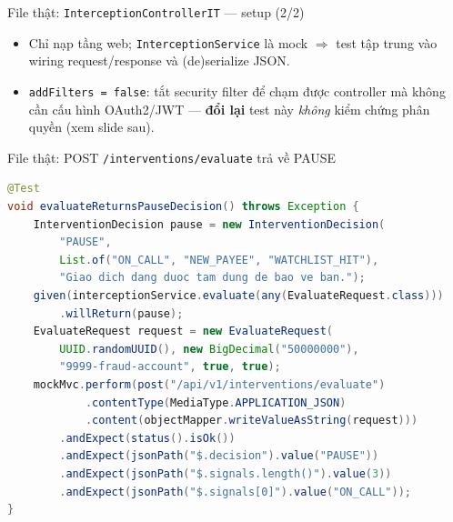 \documentclass[aspectratio=169,12pt]{beamer}
\begin{document}
\begin{frame}{File thật: \texttt{InterceptionControllerIT} --- setup (2/2)}
  \begin{itemize}\small
    \item Chỉ nạp tầng web; \texttt{InterceptionService} là mock $\Rightarrow$
      test tập trung vào wiring request/response và (de)serialize JSON.
    \item \texttt{addFilters = false}: tắt security filter để chạm được
      controller mà không cần cấu hình OAuth2/JWT --- \textbf{đổi lại} test này
      \emph{không} kiểm chứng phân quyền (xem slide sau).
  \end{itemize}
\end{frame}

\begin{frame}[fragile]{File thật: POST \texttt{/interventions/evaluate} trả về PAUSE}
\begin{lstlisting}[language=Java,style=codesm,basicstyle=\ttfamily\scriptsize]
@Test
void evaluateReturnsPauseDecision() throws Exception {
    InterventionDecision pause = new InterventionDecision(
        "PAUSE",
        List.of("ON_CALL", "NEW_PAYEE", "WATCHLIST_HIT"),
        "Giao dich dang duoc tam dung de bao ve ban.");
    given(interceptionService.evaluate(any(EvaluateRequest.class)))
        .willReturn(pause);
    EvaluateRequest request = new EvaluateRequest(
        UUID.randomUUID(), new BigDecimal("50000000"),
        "9999-fraud-account", true, true);
    mockMvc.perform(post("/api/v1/interventions/evaluate")
            .contentType(MediaType.APPLICATION_JSON)
            .content(objectMapper.writeValueAsString(request)))
        .andExpect(status().isOk())
        .andExpect(jsonPath("$.decision").value("PAUSE"))
        .andExpect(jsonPath("$.signals.length()").value(3))
        .andExpect(jsonPath("$.signals[0]").value("ON_CALL"));
}
\end{lstlisting}
\end{frame}
\end{document}
